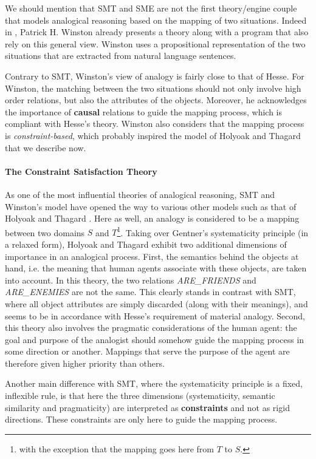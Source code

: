 We should mention that SMT and SME are not the first theory/engine couple that
models analogical reasoning based on the mapping of two situations. Indeed in
\cite{Win80}, Patrick H. Winston already presents a theory along with a
program that also rely on this general view. Winston uses a propositional
representation of the two situations that are extracted from natural language
sentences.

Contrary to SMT, Winston's view of analogy is fairly close to that of Hesse.
For Winston, the matching between the two situations should not only involve
high order relations, but also the attributes of the objects. Moreover, he
acknowledges the importance of \textbf{causal} relations to guide the mapping
process, which is compliant with Hesse's theory. Winston also considers that
the mapping process is \textit{constraint-based}, which probably inspired the
model of Holyoak and Thagard that we describe now.

\paragraph{The Constraint Satisfaction Theory\\}

As one of the most influential theories of analogical reasoning, SMT and
Winston's model have opened the way to various other models such as that of
Holyoak and Thagard \cite{HolTha89}. Here as well, an analogy is considered to
be a mapping between two domains $S$ and $T$\footnote{with the exception that
the mapping goes here from $T$ to $S$.}. Taking over Gentner's systematicity
principle (in a relaxed form), Holyoak and Thagard exhibit two additional
dimensions of importance in an analogical process. First, the semantics behind
the objects at hand, i.e.  the meaning that human agents associate with these
objects, are taken into account. In this theory, the two relations
\textit{ARE\_FRIENDS} and \textit{ARE\_ENEMIES} are not the same. This clearly
stands in contrast with SMT, where all object attributes are simply discarded
(along with their meanings), and seems to be in accordance with Hesse's
requirement of material analogy. Second, this theory also involves the
pragmatic considerations of the human agent: the goal and purpose of the
analogist should somehow guide the mapping process in some direction or
another. Mappings that serve the purpose of the agent are therefore given
higher priority than others.

Another main difference with SMT, where the systematicity principle is a fixed,
inflexible rule, is that here the three dimensions (systematicity, semantic
similarity and pragmaticity) are interpreted as \textbf{constraints} and not as
rigid directions. These constraints are only here to guide the mapping process.

